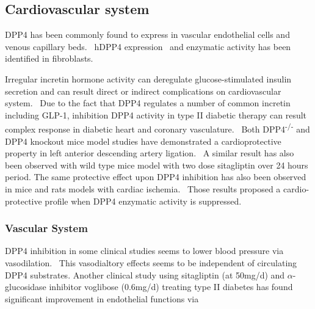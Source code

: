 \subsection{Cardiovascular system}
DPP4 has been commonly found to express in vascular endothelial cells and venous capillary beds.~\cite{Matheeussen2013,Shigeta2012} hDPP4 expression~\cite{Nemoto1999} and enzymatic activity has been identified in fibroblasts.~\cite{Ospelt2010}
\par 
Irregular incretin hormone activity can deregulate glucose-stimulated insulin secretion and can result direct or indirect complications on cardiovascular system.~\cite{Ussher2012} Due to the fact that DPP4 regulates a number of common incretin including GLP-1, inhibition DPP4 activity in type II diabetic therapy can result complex response in diabetic heart and coronary vasculature.~\cite{Ussher2014} Both DPP4\textsuperscript{-/-} and DPP4 knockout mice model studies have demonstrated a cardioprotective property in left anterior descending artery ligation.~\cite{Sauvé2010} A similar result has also been observed with wild type mice model with two dose sitagliptin over 24 hours period. The same protective effect upon DPP4 inhibition has also been observed in mice and rats models with cardiac ischemia.~\cite{Ussher2012} Those results proposed a cardio-protective profile when DPP4 enzymatic activity is suppressed. 
\par 

\subsubsection{Vascular System}
DPP4 inhibition in some clinical studies seems to lower blood pressure via vasodilation.~\cite{Kröller-Schön2012} This vasodialtory effects seems to be independent of circulating DPP4 substrates. Another clinical study using sitagliptin (at 50mg/d) and $\alpha$-glucosidase inhibitor voglibose (0.6mg/d) treating type II diabetes has found significant improvement in endothelial functions via   